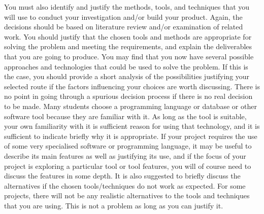 {    You must also identify and justify the methods, tools, and techniques that you will use to conduct your investigation and/or build your product. Again, the decisions
    should be based on literature review and/or examination of related work. You should justify that the chosen tools and methods are appropriate for solving the problem
    and meeting the requirements, and explain the deliverables that you are going to produce.
    You may find that you now have several possible approaches and technologies that could be used to solve the problem. If this is the case, you should provide a short
    analysis of the possibilities justifying your selected route if the factors influencing your choices are worth discussing. There is no point in going through a spurious
    decision process if there is no real decision to be made. Many students choose a programming language or database or other software tool because they are familiar with it.
    As long as the tool is suitable, your own familiarity with it is sufficient reason for using that technology, and it is sufficient to indicate briefly why it is appropriate.
    If your project requires the use of some very specialised software or programming language, it may be useful to describe its main features as well as justifying its use,
    and if the focus of your project is exploring a particular tool or tool features, you will of course need to discuss the features in some depth. It is also suggested
    to briefly discuss the alternatives if the chosen tools/techniques do not work as expected. For some projects, there will not be any realistic alternatives to the tools
    and techniques that you are using. This is not a problem as long as you can justify it.
}
